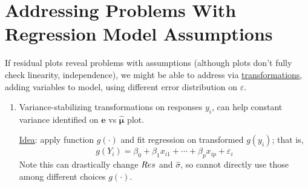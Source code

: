 \section{Addressing Problems With Regression Model Assumptions}

If residual plots reveal problems with assumptions
(although plots don't fully check linearity, independence),
we might be able to address via \underline{transformations},
adding variables to model, using different error
distribution on $ \varepsilon $.
\begin{enumerate}[label=(\arabic*)]
    \item Variance-stabilizing transformations on
          responses $ y_i $, can help constant variance identified
          on $ \symbf{e} $ vs $ \hat{\symbf{\mu}} $ plot.

          \underline{Idea}: apply function $ g(\cdot) $ and fit
          regression on transformed $ g(y_i) $; that is,
          \[ g(Y_i)=\beta_0+\beta_1x_{i1}+\cdots+\beta_p x_{ip}+\varepsilon_i \]
          Note this can drastically change $ \relax{Res} $
          and $ \hat{\sigma} $, so cannot directly use those among different
          choices $ g(\cdot) $.


\end{enumerate}
